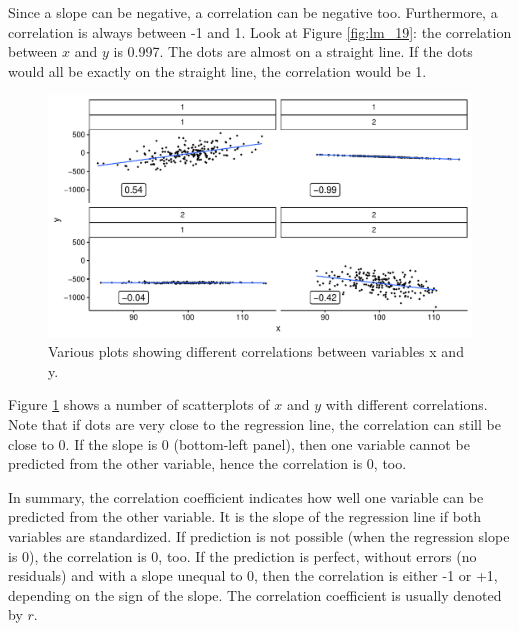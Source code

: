 \documentclass[]{book}\usepackage[]{graphicx}\usepackage[]{color}
\makeatletter
\def\maxwidth{ %
  \ifdim\Gin@nat@width>\linewidth
    \linewidth
  \else
    \Gin@nat@width
  \fi
}
\newenvironment{knitrout}{}{} %
\makeatother
\begin{document}
Since a slope can be negative, a correlation can be negative too. Furthermore, a correlation is always between -1 and 1. Look at Figure \ref{fig:lm_19}: the correlation between $x$ and $y$ is 0.997. The dots are almost on a straight line. If the dots would all be exactly on the straight line, the correlation would be 1.

\begin{knitrout}
\color{fgcolor}\begin{figure}

{\centering \includegraphics[width=\maxwidth]{figure/lm_20-1} 

}

\caption[Various plots showing different correlations between variables x and y]{Various plots showing different correlations between variables x and y.}\label{fig:lm_20}
\end{figure}


\end{knitrout}


Figure \ref{fig:lm_20} shows a number of scatterplots of $x$ and $y$ with different correlations. Note that if dots are very close to the regression line, the correlation can still be close to 0. If the slope is 0 (bottom-left panel), then one variable cannot be predicted from the other variable, hence the correlation is 0, too.

In summary, the correlation coefficient indicates how well one variable can be predicted from the other variable. It is the slope of the regression line if both variables are standardized. If prediction is not possible (when the regression slope is 0), the correlation is 0, too. If the prediction is perfect, without errors (no residuals) and with a slope unequal to 0, then the correlation is either -1 or +1, depending on the sign of the slope. The correlation coefficient is usually denoted by $r$.
\end{document}
